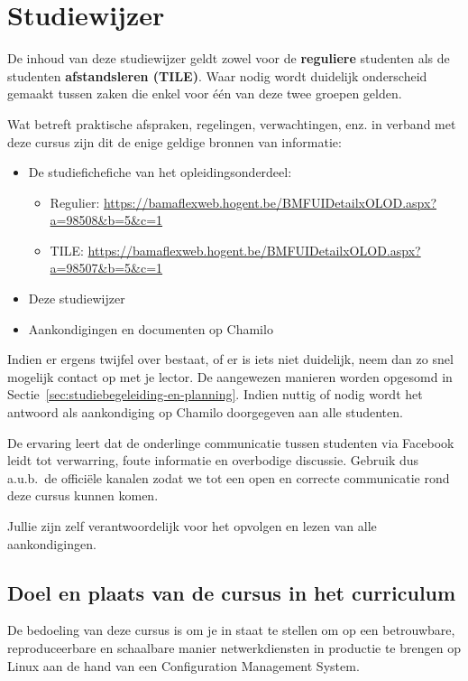\chapter{Studiewijzer}
\label{ch:studiewijzer}

De inhoud van deze studiewijzer geldt zowel voor de \textbf{reguliere} studenten als de studenten \textbf{afstandsleren (TILE)}. Waar nodig wordt duidelijk onderscheid gemaakt tussen zaken die enkel voor één van deze twee groepen gelden.

Wat betreft praktische afspraken, regelingen, verwachtingen, enz. in
verband met deze cursus zijn dit de enige geldige bronnen van
informatie:

\begin{itemize}
  \item De studiefichefiche van het opleidingsonderdeel:
  \begin{itemize}
    \item Regulier: \url{https://bamaflexweb.hogent.be/BMFUIDetailxOLOD.aspx?a=98508&b=5&c=1}
    \item TILE: \url{https://bamaflexweb.hogent.be/BMFUIDetailxOLOD.aspx?a=98507&b=5&c=1}
  \end{itemize}
  \item Deze studiewijzer
  \item Aankondigingen en documenten op Chamilo
\end{itemize}

Indien er ergens twijfel over bestaat, of er is iets niet duidelijk, neem dan zo snel mogelijk contact op met je lector. De aangewezen manieren worden opgesomd in Sectie~\ref{sec:studiebegeleiding-en-planning}. Indien nuttig of nodig wordt het antwoord als aankondiging op Chamilo doorgegeven aan alle studenten.

De ervaring leert dat de onderlinge communicatie tussen studenten via Facebook leidt tot verwarring, foute informatie en overbodige discussie. Gebruik dus a.u.b.~de officiële kanalen zodat we tot een open en correcte communicatie rond deze cursus kunnen komen.

Jullie zijn zelf verantwoordelijk voor het opvolgen en lezen van alle aankondigingen.

\section{Doel en plaats van de cursus in het curriculum}
\label{sec:doel-en-plaats}

De bedoeling van deze cursus is om je in staat te stellen om op een betrouwbare, reproduceerbare en schaalbare manier netwerkdiensten in productie te brengen op Linux aan de hand van een Configuration Management System.

